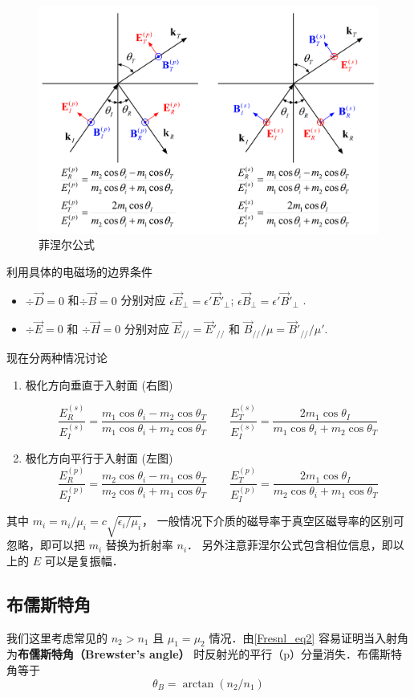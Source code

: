
\begin{figure}[ht]
\centering
\includegraphics[width=14cm]{./figures/Fresnl.pdf}
\caption{菲涅尔公式} \label{Sample_fig1}
\end{figure}
 
利用具体的电磁场的边界条件 %
\begin{itemize}
\item $\div \vec D = 0$ 和$\div \vec B = 0$  分别对应 $\epsilon {\vec E_ \bot } = \epsilon '{\vec E'_ \bot }$; $\epsilon {\vec B_ \bot } = \epsilon '{\vec B'_ \bot }$ .

\item $\div \vec E = 0$ 和 $\div \vec H = 0$ 分别对应 ${\vec E_{//}} = {\vec E'_{//}}$ 和 ${{{{\vec B}_{//}}}}/{\mu } = {{{{\vec B'}_{//}}}}/{{\mu '}}$.
\end{itemize}

现在分两种情况讨论
\begin{enumerate}
\item 极化方向垂直于入射面 (右图)

\begin{equation}
\frac{{E_R^{(s)}}}{{E_I^{(s)}}} =  \frac{{{m_1}\cos {\theta _i} - {m_2}\cos {\theta _T}}}{{{m_1}\cos {\theta _i} + {m_2}\cos {\theta _T}}}
\qquad
\frac{{E_T^{(s)}}}{{E_I^{(s)}}} = \frac{{2{m_1}\cos {\theta _I}}}{{{m_1}\cos {\theta _i} + {m_2}\cos {\theta _T}}}
\end{equation}

\item 极化方向平行于入射面 (左图)
\begin{equation}\label{Fresnl_eq2}
\frac{{E_R^{(p)}}}{{E_I^{(p)}}} =  \frac{{{m_2}\cos {\theta _i} - {m_1}\cos {\theta _T}}}{{{m_2}\cos {\theta _i} + {m_1}\cos {\theta _T}}}
\qquad
\frac{{E_T^{(p)}}}{{E_I^{(p)}}} =  \frac{{2{m_1}\cos {\theta _I}}}{{{m_2}\cos {\theta _i} + {m_1}\cos {\theta _T}}}
\end{equation}
\end{enumerate}
其中 $m_i=n_i/\mu_i = c\sqrt{\epsilon_i/\mu_i}$， 一般情况下介质的磁导率于真空区磁导率的区别可忽略，即可以把 $m_i$ 替换为折射率 $n_i$． 另外注意菲涅尔公式包含相位信息，即以上的 $E$ 可以是复振幅．

\subsection{布儒斯特角}
我们这里考虑常见的 $n_2>n_1$ 且 $\mu_1=\mu_2$ 情况．由\autoref{Fresnl_eq2} 容易证明当入射角为\textbf{布儒斯特角（Brewster's angle）} 时反射光的平行（p）分量消失．布儒斯特角等于
\begin{equation}
{\theta _B} = \arctan ({n_2}/{n_1})
\end{equation}
